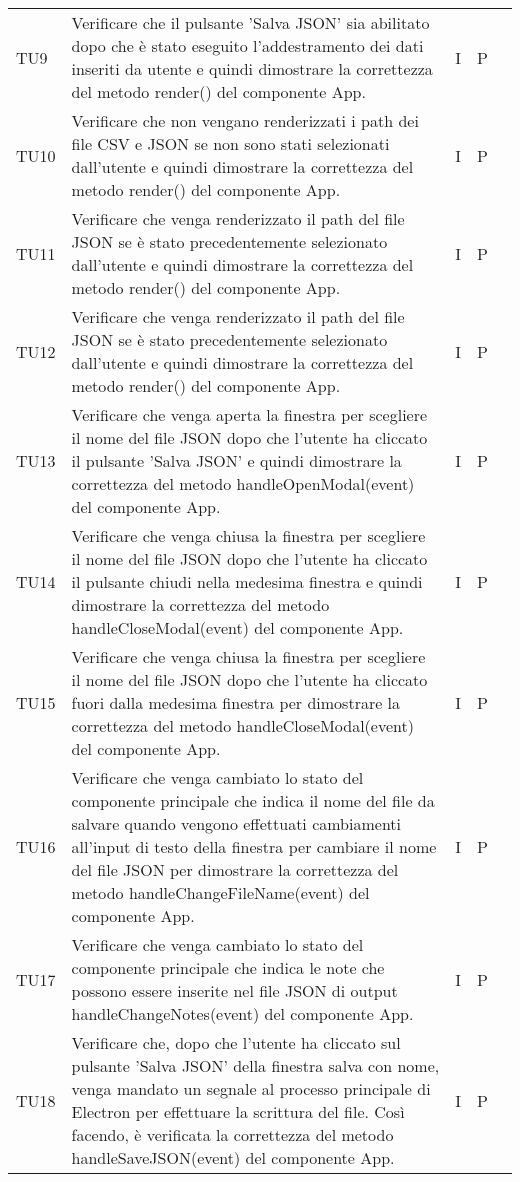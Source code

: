 \begin{longtable} {
		>{}p{15mm} 
		>{}p{79.5mm}
		>{}p{15mm} 
		>{}p{15mm}
		>{}p{0mm}}
	TU9		& Verificare che il pulsante 'Salva JSON' sia abilitato dopo che è stato eseguito l'addestramento dei dati inseriti da utente e quindi dimostrare la correttezza del metodo render() del componente App. & I & P &\TBstrut \\ [2mm]
	TU10	& Verificare che non vengano renderizzati i path dei file CSV e JSON se non sono stati selezionati dall'utente e quindi dimostrare la correttezza del metodo render() del componente App. & I & P &\TBstrut \\ [2mm]
	TU11	& Verificare che venga renderizzato il path del file JSON se è stato precedentemente selezionato dall'utente e quindi dimostrare la correttezza del metodo render() del componente App. & I & P &\TBstrut \\ [2mm]
	TU12	& Verificare che venga renderizzato il path del file JSON se è stato precedentemente selezionato dall'utente e quindi dimostrare la correttezza del metodo render() del componente App. & I & P &\TBstrut \\ [2mm]
	TU13	& Verificare che venga aperta la finestra per scegliere il nome del file JSON dopo che l'utente ha cliccato il pulsante 'Salva JSON' e quindi dimostrare la correttezza del metodo handleOpenModal(event) del componente App. & I & P &\TBstrut \\ [2mm]
	TU14	& Verificare che venga chiusa la finestra per scegliere il nome del file JSON dopo che l'utente ha cliccato il pulsante chiudi nella medesima finestra e quindi dimostrare la correttezza del metodo handleCloseModal(event) del componente App. & I & P &\TBstrut \\ [2mm]
	TU15	& Verificare che venga chiusa la finestra per scegliere il nome del file JSON dopo che l'utente ha cliccato fuori dalla medesima finestra per dimostrare la correttezza del metodo handleCloseModal(event) del componente App. & I & P &\TBstrut \\ [2mm]
	TU16	& Verificare che venga cambiato lo stato del componente principale che indica il nome del file da salvare quando vengono effettuati cambiamenti all'input di testo della finestra per cambiare il nome del file JSON per dimostrare la correttezza del metodo handleChangeFileName(event) del componente App. & I & P &\TBstrut \\ [2mm]
	TU17	& Verificare che venga cambiato lo stato del componente principale che indica le note che possono essere inserite nel file JSON di output handleChangeNotes(event) del componente App. & I & P &\TBstrut \\ [2mm]
	TU18	& Verificare che, dopo che l'utente ha cliccato sul pulsante 'Salva JSON' della finestra salva con nome, venga mandato un segnale al processo principale di Electron per effettuare la scrittura del file. Così facendo, è verificata la correttezza del metodo handleSaveJSON(event) del componente App. & I & P &\TBstrut \\ [2mm]

\end{longtable}
